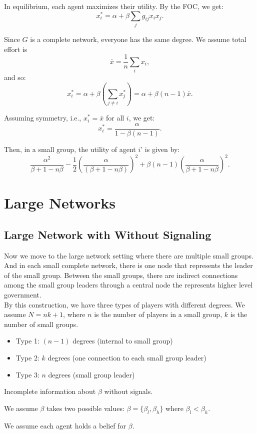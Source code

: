 \documentclass[12pt]{article}
\begin{document}
In equilibrium, each agent maximizes their utility. By the FOC, we get:
\[
x_i^* = \alpha + \beta \sum_j g_{ij}x_i x_j. \tag{2}
\]

Since $G$ is a complete network, everyone has the same degree. We assume total effort is  
\[
\bar{x} = \frac{1}{n} \sum_i x_i,
\]
and so:
\[
x_i^* = \alpha + \beta \left( \sum_{j \neq i} x_j^* \right) = \alpha + \beta(n - 1)\bar{x}. \tag{3}
\]

Assuming symmetry, i.e., $x_i^* = \bar{x}$ for all $i$, we get:
\[
x_i^* = \frac{\alpha}{1 - \beta(n - 1)}.
\]

Then, in a small group, the utility of agent $i$' is given by:
\[
\frac{\alpha^2}{\beta + 1 - n\beta} - \frac{1}{2} \left( \frac{\alpha}{(\beta + 1 - n\beta)} \right)^2 + \beta(n - 1) \left( \frac{\alpha}{\beta + 1 - n\beta} \right)^2. \tag{4}
\]


\section{Large Networks}
\subsection{Large Network with Without Signaling}
Now we move to the large network setting where there are multiple small groups. And in each small complete network, there is one node that represents the leader of the small group. Between the small groups, there are indirect connections among the small group leaders through a central node the represents higher level government.\\
By this construction, we have three types of players with different degrees.  
We assume $N = nk + 1$, where $n$ is the number of players in a small group, $k$ is the number of small groups.

\begin{itemize}
    \item Type 1: $(n-1)$ degrees (internal to small group)
    \item Type 2: $k$ degrees (one connection to each small group leader)
    \item Type 3: $n$ degrees (small group leader)
\end{itemize}

Incomplete information about $\beta$ without signals.

We assume $\beta$ takes two possible values: $\beta = \{\beta_l,\beta_h\}$ where $\beta_l < \beta_h$. 

We assume each agent holds a belief for $\beta$.
\end{document}
